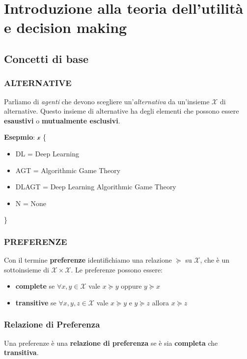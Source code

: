 \section{Introduzione alla teoria dell'utilità e decision making}
\subsection{Concetti di base}
\subsubsection{ALTERNATIVE}
Parliamo di \textit{agenti} che devono scegliere un'\textit{alternativa} da
un'insieme $\mathcal{X}$ di alternative. Questo insieme di alternative ha degli
elementi che possono essere \textbf{esaustivi} o \textbf{mutualmente
    esclusivi}.

\textbf{Esepmio}: $\mathcal{x}$ \{
\begin{itemize}
    \item DL = Deep Learning
    \item AGT = Algorithmic Game Theory
    \item DLAGT = Deep Learning Algorithmic Game Theory
    \item N = None
\end{itemize}
\}

\subsubsection{PREFERENZE}

Con il termine \textbf{preferenze} identifichiamo una relazione $\succcurlyeq$
su $\mathcal{X}$, che è un sottoinsieme di $\mathcal{X} \times \mathcal{X}$. Le
preferenze possono essere:
\begin{itemize}
    \item \textbf{complete} se $\forall x,y \in \mathcal{X}$ vale $x \succcurlyeq y$ oppure $y \succcurlyeq x$
    \item \textbf{transitive} se $\forall x,y,z \in \mathcal{X}$ vale $x \succcurlyeq y$ e $y \succcurlyeq z$ allora $x \succcurlyeq z$
\end{itemize}

\subsubsection{Relazione di Preferenza}

Una preferenze è una \textbf{relazione di preferenza} se è sia
\textbf{completa} che \textbf{transitiva}.

